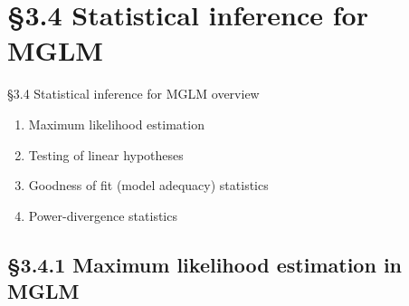 \documentclass{beamer}
\newcommand{\currentsection}{}
\let\oldsection\section
\renewcommand{\section}[1]{\oldsection{#1}\renewcommand{\currentsection}{#1}}
\newcommand{\currentsubsection}{}
\let\oldsubsection\subsection
\renewcommand{\subsection}[1]{\oldsubsection{#1}\renewcommand{\currentsubsection}{#1}}
\begin{document}
\section{\S3.4 Statistical inference for MGLM}\label{sec:3.4}
\begin{frame}{\S3.4 Statistical inference for MGLM overview}
\begin{enumerate}
\item
Maximum likelihood estimation
\item
Testing of linear hypotheses
\item
Goodness of fit (model adequacy) statistics
\item
Power-divergence statistics
\end{enumerate}
\end{frame}

\subsection{\S3.4.1 Maximum likelihood estimation in MGLM}\label{sec:3.4.1}
\end{document}
